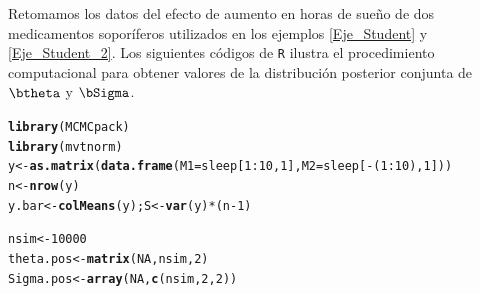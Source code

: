\documentclass[10pt,openright]{book}\usepackage[]{graphicx}\usepackage[]{color}
\makeatletter
\newcommand{\hlnum}[1]{\textcolor[rgb]{0.686,0.059,0.569}{#1}}%
\newcommand{\hlopt}[1]{\textcolor[rgb]{0,0,0}{#1}}%
\newcommand{\hlstd}[1]{\textcolor[rgb]{0.345,0.345,0.345}{#1}}%
\newcommand{\hlkwb}[1]{\textcolor[rgb]{0.69,0.353,0.396}{#1}}%
\newcommand{\hlkwc}[1]{\textcolor[rgb]{0.333,0.667,0.333}{#1}}%
\newcommand{\hlkwd}[1]{\textcolor[rgb]{0.737,0.353,0.396}{\textbf{#1}}}%
\newenvironment{kframe}{%
 \def\at@end@of@kframe{}%
 \ifinner\ifhmode%
  \def\at@end@of@kframe{\end{minipage}}%
  \begin{minipage}{\columnwidth}%
 \fi\fi%
 \def\FrameCommand##1{\hskip\@totalleftmargin \hskip-\fboxsep
 \colorbox{shadecolor}{##1}\hskip-\fboxsep
     \hskip-\linewidth \hskip-\@totalleftmargin \hskip\columnwidth}%
 \MakeFramed {\advance\hsize-\width
   \@totalleftmargin\z@ \linewidth\hsize
   \@setminipage}}%
 {\par\unskip\endMakeFramed%
 \at@end@of@kframe}
\newenvironment{knitrout}{}{} %
\makeatother
\begin{document}
\begin{Eje}\label{Eje_Student_3}
Retomamos los datos del efecto de aumento en horas de sue\~no de dos medicamentos sopor\'iferos utilizados en los ejemplos \ref{Eje_Student} y \ref{Eje_Student_2}. Los siguientes c\'odigos de \verb'R' ilustra el procedimiento computacional para obtener valores de la distribuci\'on posterior conjunta de $\btheta$ y $\bSigma$.

\begin{knitrout}
\color{fgcolor}\begin{kframe}
\begin{alltt}
\hlkwd{library}\hlstd{(MCMCpack)}
\hlkwd{library}\hlstd{(mvtnorm)}
\hlstd{y} \hlkwb{<-} \hlkwd{as.matrix}\hlstd{(}\hlkwd{data.frame}\hlstd{(}\hlkwc{M1}\hlstd{=sleep[}\hlnum{1}\hlopt{:}\hlnum{10}\hlstd{,}\hlnum{1}\hlstd{],} \hlkwc{M2}\hlstd{=sleep[}\hlopt{-}\hlstd{(}\hlnum{1}\hlopt{:}\hlnum{10}\hlstd{),}\hlnum{1}\hlstd{]))}
\hlstd{n} \hlkwb{<-} \hlkwd{nrow}\hlstd{(y)}
\hlstd{y.bar} \hlkwb{<-} \hlkwd{colMeans}\hlstd{(y); S} \hlkwb{<-} \hlkwd{var}\hlstd{(y)}\hlopt{*}\hlstd{(n}\hlopt{-}\hlnum{1}\hlstd{)}

\hlstd{nsim} \hlkwb{<-} \hlnum{10000}
\hlstd{theta.pos} \hlkwb{<-} \hlkwd{matrix}\hlstd{(}\hlnum{NA}\hlstd{, nsim,} \hlnum{2}\hlstd{)}
\hlstd{Sigma.pos} \hlkwb{<-} \hlkwd{array}\hlstd{(}\hlnum{NA}\hlstd{,} \hlkwd{c}\hlstd{(nsim,}\hlnum{2}\hlstd{,}\hlnum{2}\hlstd{))}


\end{alltt}
\end{kframe}
\end{knitrout}
\end{Eje}
\end{document}

